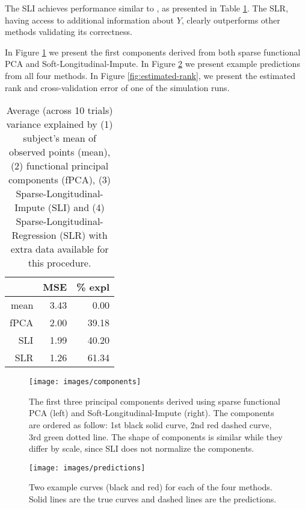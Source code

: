 \documentclass[preprint]{imsart}
\numberwithin{equation}{section}
\theoremstyle{plain}
\begin{document}
The SLI achieves performance similar to \citep{james2000principal}, as presented in Table \ref{tbl:simulations}. The SLR, having access to additional information about $Y$, clearly outperforms other methods validating its correctness.

In Figure \ref{fig:principal-components} we present the first components derived from both sparse functional PCA and Soft-Longitudinal-Impute. In Figure \ref{fig:example-predictions} we present example predictions from all four methods. In Figure \ref{fig:estimated-rank}, we present the estimated rank and cross-validation error of one of the simulation runs.

\begin{table}[ht]
\centering
\begin{tabular}{rrr}
  \hline
 & MSE & \% expl \\ 
  \hline
  mean & 3.43 & 0.00 \\ 
  fPCA & 2.00 & 39.18 \\ 
  SLI & 1.99 & 40.20 \\ 
  SLR & 1.26 & 61.34 \\ 
   \hline
\end{tabular}\label{tbl:simulations}
\caption{Average (across 10 trials) variance explained by (1) subject's mean of observed points (mean), (2) functional principal components (fPCA), (3) Sparse-Longitudinal-Impute (SLI) and (4) Sparse-Longitudinal-Regression (SLR) with extra data available for this procedure.}
\end{table}

\begin{figure}[h!]
  \texttt{[image: images/components]}
  \caption{The first three principal components derived using sparse functional PCA (left) and Soft-Longitudinal-Impute (right). The components are ordered as follow: 1st black solid curve, 2nd red dashed curve, 3rd green dotted line. The shape of components is similar while they differ by scale, since SLI does not normalize the components.}
  \label{fig:principal-components}
\end{figure}

\begin{figure}[h!]
  \texttt{[image: images/predictions]}
  \caption{Two example curves (black and red) for each of the four methods. Solid lines are the true curves and dashed lines are the predictions. }
  \label{fig:example-predictions}
\end{figure}
\end{document}
